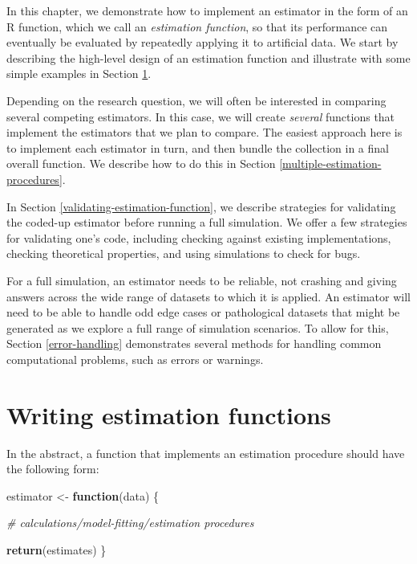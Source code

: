 \documentclass[
]{book}
\newenvironment{Shaded}{\begin{snugshade}}{\end{snugshade}}
\newcommand{\CommentTok}[1]{\textcolor[rgb]{0.56,0.35,0.01}{\textit{#1}}}
\newcommand{\ControlFlowTok}[1]{\textcolor[rgb]{0.13,0.29,0.53}{\textbf{#1}}}
\newcommand{\FunctionTok}[1]{\textcolor[rgb]{0.13,0.29,0.53}{\textbf{#1}}}
\newcommand{\NormalTok}[1]{#1}
\newcommand{\OtherTok}[1]{\textcolor[rgb]{0.56,0.35,0.01}{#1}}
\begin{document}
In this chapter, we demonstrate how to implement an estimator in the form of an R function, which we call an \emph{estimation function}, so that its performance can eventually be evaluated by repeatedly applying it to artificial data.
We start by describing the high-level design of an estimation function and illustrate with some simple examples in Section \ref{estimation-functions}.

Depending on the research question, we will often be interested in comparing several competing estimators.
In this case, we will create \emph{several} functions that implement the estimators that we plan to compare.
The easiest approach here is to implement each estimator in turn, and then bundle the collection in a final overall function.
We describe how to do this in Section \ref{multiple-estimation-procedures}.

In Section \ref{validating-estimation-function}, we describe strategies for validating the coded-up estimator before running a full simulation.
We offer a few strategies for validating one's code, including checking against existing implementations, checking theoretical properties, and using simulations to check for bugs.

For a full simulation, an estimator needs to be reliable, not crashing and giving answers across the wide range of datasets to which it is applied.
An estimator will need to be able to handle odd edge cases or pathological datasets that might be generated as we explore a full range of simulation scenarios.
To allow for this, Section \ref{error-handling} demonstrates several methods for handling common computational problems, such as errors or warnings.

\section{Writing estimation functions}\label{estimation-functions}

In the abstract, a function that implements an estimation procedure should have the following form:

\begin{Shaded}
\begin{Highlighting}[]
\NormalTok{estimator }\OtherTok{\textless{}{-}} \ControlFlowTok{function}\NormalTok{(data) \{}

  \CommentTok{\# calculations/model{-}fitting/estimation procedures}
  
  \FunctionTok{return}\NormalTok{(estimates)}
\NormalTok{\}}
\end{Highlighting}
\end{Shaded}
\end{document}
